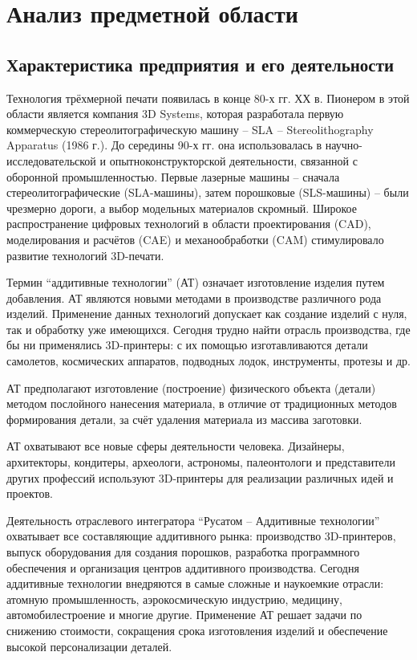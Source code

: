 \newpage
\section{Анализ предметной области}
\subsection{Характеристика предприятия и его деятельности}

Технология трёхмерной печати появилась в конце 80-х гг. ХХ в. Пионером в этой области является компания 3D Systems, которая разработала первую коммерческую стереолитографическую машину – SLA – Stereolithography Apparatus (1986 г.). До середины 90-х гг. она использовалась в научно-исследовательской и опытноконструкторской деятельности, связанной с оборонной промышленностью. Первые лазерные машины – сначала стереолитографические (SLA-машины), затем порошковые (SLS-машины) – были чрезмерно дороги, а выбор модельных материалов скромный. Широкое распространение цифровых технологий в области проектирования (CAD), моделирования и расчётов (CAE) и механообработки (CAM) стимулировало развитие технологий 3D-печати. 

Термин ``аддитивные технологии'' (АТ) означает изготовление изделия путем добавления. АТ являются новыми методами в производстве различного рода изделий. Применение данных технологий допускает как создание изделий с нуля, так и обработку уже имеющихся. Сегодня трудно найти отрасль производства, где бы ни применялись 3D-принтеры: с их помощью изготавливаются детали самолетов, космических аппаратов, подводных лодок, инструменты, протезы и др.

АТ предполагают изготовление (построение) физического объекта (детали) методом послойного нанесения материала, в отличие от традиционных методов формирования детали, за счёт удаления материала из массива заготовки.

АТ охватывают все новые сферы деятельности человека. Дизайнеры, архитекторы, кондитеры, археологи, астрономы, палеонтологи и представители других профессий используют 3D-принтеры для реализации различных идей и проектов. 

Деятельность отраслевого интегратора ``Русатом – Аддитивные технологии'' охватывает все составляющие аддитивного рынка: производство 3D-принтеров, выпуск оборудования для создания порошков, разработка программного обеспечения и организация центров аддитивного производства. Сегодня аддитивные технологии внедряются в самые сложные и наукоемкие отрасли: атомную промышленность, аэрокосмическую индустрию, медицину, автомобилестроение и многие другие. Применение АТ решает задачи по снижению стоимости, сокращения срока изготовления изделий и обеспечение высокой персонализации деталей.
